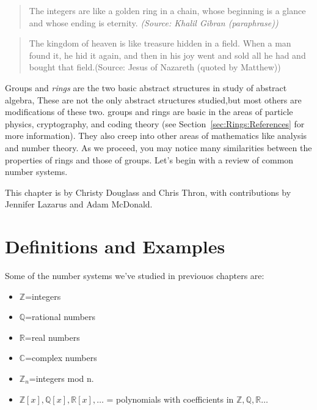 
\begin{quote}
The integers are like a golden ring in a chain, whose beginning is a glance and whose ending is eternity.     
\emph{(Source:  Khalil Gibran (\emph{paraphrase}))}
\end{quote}

\begin{quote}
The kingdom of heaven is like treasure hidden in a field. When a man found it, he hid it again, and then in his joy went and sold all he had and bought that field.(Source:  Jesus of Nazareth (quoted by Matthew))
\end{quote}

Groups and  \emph{rings} are the two basic abstract structures in study of abstract algebra, These are not the only abstract structures studied,but most others are  modifications of these two. groups and rings are basic in the areas of particle physics, cryptography, and coding theory (see Section~\ref{sec:Rings:References} for more information). They also creep into other areas of mathematics like analysis and number theory.
 As we proceed, you may notice many similarities between the properties of rings and those of groups. Let's begin with a review of common number systems.

This chapter is by Christy Douglass and Chris Thron, with contributions by Jennifer Lazarus and Adam McDonald.

\section{Definitions and Examples \quad{}}
\label{sec:Rings:DefinitionsAndExamples}

Some of the number systems we've studied in previouos chapters are:
\begin{itemize}
\item ${\mathbb Z}$=integers
\item ${\mathbb Q}$=rational numbers
\item ${\mathbb R}$=real numbers
\item ${\mathbb C}$=complex numbers
\item ${\mathbb Z}_n$=integers mod n.
\item ${\mathbb Z}[x],  {\mathbb Q}[x], {\mathbb R}[x], \ldots$ = polynomials with coefficients in ${\mathbb Z, \mathbb Q, \mathbb R  \ldots}$     
\end{itemize}

